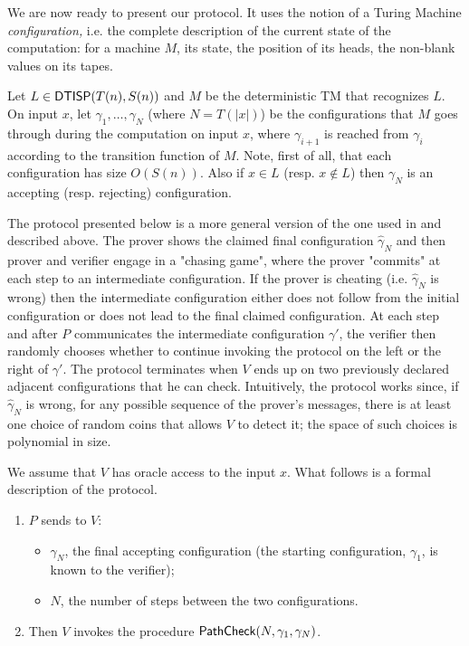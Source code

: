 \label{sec:protocol}
We are now ready to present our protocol. It uses the notion of a Turing Machine {\em configuration,} i.e. 
the complete description of the current state of the computation: for a machine $M$, its state, the position of its heads, the non-blank values on its tapes.  

Let $L \in {\ensuremath{\mathsf{DTISP}}}(T(n),S(n))$ and $M$ be the deterministic TM that recognizes $L$. 
On input $x$, let $\gamma_1,\ldots,\gamma_N$ (where $N=T(|x|)$) be the 
configurations that $M$ goes through during the computation on input $x$, where 
$\gamma_{i+1}$ is reached from $\gamma_i$ according to the transition function of $M$. Note, first of all, that each configuration has size $O(S(n))$. Also if $x \in L$ (resp. $x \notin L$) then $\gamma_N$ is an accepting (resp. rejecting) configuration. 


The protocol presented below is a more general version of the one used in \cite{cg15} and described above. 
The prover shows the claimed final configuration $\hat{\gamma}_N$ 
and then prover and 
verifier engage in a "chasing game", where the prover "commits" at each step to an intermediate configuration. If the prover is cheating (i.e. $\hat{\gamma}_N$ is wrong) then the intermediate configuration either does not follow from the initial configuration or does not lead to the final claimed configuration. At each step and after $P$ communicates the intermediate configuration $\gamma'$, the verifier then randomly chooses whether to continue invoking the protocol on the left or the right of $\gamma'$. The protocol terminates when $V$ ends up on two previously declared adjacent configurations that he can check.  Intuitively, the protocol works since, if $\hat{\gamma}_N$ is wrong, for any possible sequence of the prover's messages, there is at least one choice of random coins that allows $V$ to detect it; the space of such choices is polynomial in size.

We assume that $V$ has oracle access to the input $x$.
\noindent What follows is a formal description of the protocol.
\begin{framed}
\begin{enumerate}
    \item $P$ sends to $V$:
    \begin{itemize}
    \item $\gamma_{N}$, the final accepting configuration (the starting configuration, $\gamma_1$, is known to the verifier);
    \item $N$, the number of steps between the two configurations. %
    \end{itemize}
    \item Then $V$ invokes the procedure $\mathsf{PathCheck}(N, \gamma_{1}, \gamma_{N})$.
\end{enumerate}
\end{framed}

